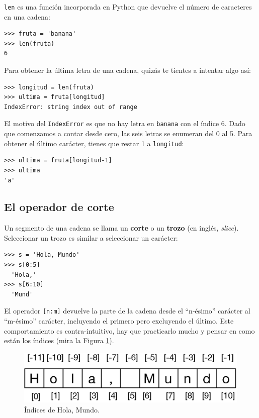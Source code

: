 \texttt{len} es una función incorporada en Python que devuelve el número de caracteres en una cadena:

\begin{Verbatim}[frame=single]
>>> fruta = 'banana'
>>> len(fruta)
6
\end{Verbatim}
%
Para obtener la última letra de una cadena, quizás te tientes a intentar algo
así:

\begin{Verbatim}[frame=single]
>>> longitud = len(fruta)
>>> ultima = fruta[longitud]
IndexError: string index out of range
\end{Verbatim}
%
El motivo del \texttt{IndexError} es que no hay letra en \texttt{banana} con el índice 6.  Dado que comenzamos a contar desde cero, las
seis letras se enumeran del 0 al 5.  Para obtener el último carácter, tienes
que restar 1 a \texttt{longitud}:

\begin{Verbatim}[frame=single]
>>> ultima = fruta[longitud-1]
>>> ultima
'a'
\end{Verbatim}

\subsection{El operador de corte}

\label{slice}
  
  

Un segmento de una cadena se llama un \textbf{corte} o un \textbf{trozo} (en inglés, {\em slice}).  Seleccionar un trozo es
similar a seleccionar un carácter:

\begin{Verbatim}[frame=single]
>>> s = 'Hola, Mundo'
>>> s[0:5]
  'Hola,'
>>> s[6:10]
  'Mund'
\end{Verbatim}
%
El operador \texttt{[n:m]} devuelve la parte de la cadena desde el 
``n-ésimo'' carácter al ``m-ésimo'' carácter, incluyendo el primero pero
excluyendo el último.  Este comportamiento es contra-intuitivo, hay que practicarlo mucho y pensar en como están los índices (mira la Figura \ref{fig:string-hola}).

\begin{figure}[t]
\centerline
{\includegraphics[scale=0.8]{images/string-hola.eps}}
\caption{Índices de Hola, Mundo.}
\label{fig:string-hola}
\end{figure}

